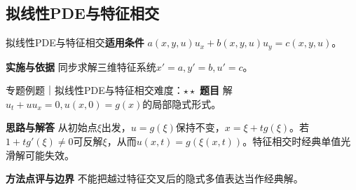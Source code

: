 \subsection{拟线性PDE与特征相交}\label{mat:difference_pde:quasilinear}
\begin{method}{拟线性PDE与特征相交}\textbf{适用条件} $a(x,y,u)u_x+b(x,y,u)u_y=c(x,y,u)$。\par\textbf{实施与依据} 同步求解三维特征系统$x\prime=a,y\prime=b,u\prime=c$。\end{method}
\begin{example}{专题例题｜拟线性PDE与特征相交}{难度：$\star\star$}
\textbf{题目} 解$u_t+u u_x=0,u(x,0)=g(x)$的局部隐式形式。\par\textbf{思路与解答} 从初始点$\xi$出发，$u=g(\xi)$保持不变，$x=\xi+t g(\xi)$。若$1+t g\prime(\xi)\ne0$可反解$\xi$，从而$u(x,t)=g(\xi(x,t))$。特征相交时经典单值光滑解可能失效。\par\textbf{方法点评与边界} 不能把越过特征交叉后的隐式多值表达当作经典解。
\end{example}
